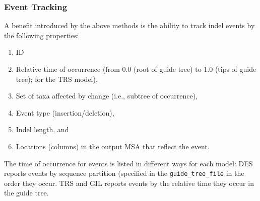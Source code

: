 \documentclass[10pt]{article}
\begin{document}
 \subsubsection*{Event Tracking}

 A benefit introduced by the above methods is the ability to track indel events by the following properties:
 \begin{enumerate}
 \item ID
 \item Relative time of occurrence (from 0.0 (root of guide tree) to 1.0 (tips of guide tree); for the TRS model),
 \item Set of taxa affected by change (i.e., subtree of occurrence),
 \item Event type (insertion/deletion),
 \item Indel length, and
 \item Locations (columns) in the output MSA that reflect the event.
 \end{enumerate}

 The time of occurrence for events is listed in different ways for each model: DES reports events by sequence partition (specified in the {\tt guide\_tree\_file} in the order they occur. TRS and GIL reports events by the relative time they occur in the guide tree.


\end{document}
